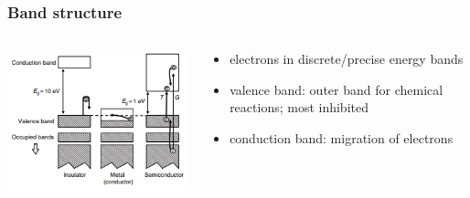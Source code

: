 \documentclass[aspectratio=1610, 9pt]{beamer}
\begin{document}
\begin{frame}\frametitle{Band structure}
  \begin{columns}
    \begin{column}[c]{0.48\textwidth}
      \includegraphics[width=\textwidth]{plots/bands.png}
    \end{column}
    \begin{column}[c]{0.48\textwidth}
      \begin{itemize}
        \item electrons in discrete/precise energy bands
        \item valence band: outer band for chemical reactions; most inhibited
        \item conduction band: migration of electrons
      \end{itemize}
    \end{column}
  \end{columns}
\end{frame}
\end{document}
